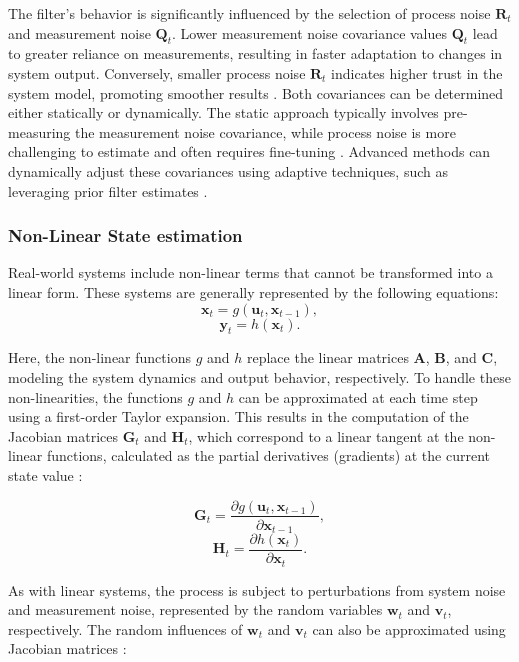 The filter's behavior is significantly influenced by the selection of process noise \( \mathbf{R}_t \) and measurement noise \( \mathbf{Q}_t \). Lower measurement noise covariance values \( \mathbf{Q}_t \) lead to greater reliance on measurements, resulting in faster adaptation to changes in system output. Conversely, smaller process noise \( \mathbf{R}_t \) indicates higher trust in the system model, promoting smoother results \citep{balzer2018kalman}. Both covariances can be determined either statically or dynamically. The static approach typically involves pre-measuring the measurement noise covariance, while process noise is more challenging to estimate and often requires fine-tuning \citep{welch2006kalman}. Advanced methods can dynamically adjust these covariances using adaptive techniques, such as leveraging prior filter estimates \citep{welch2006kalman}.


\subsubsection{Non-Linear State estimation}

Real-world systems include non-linear terms that cannot be transformed into a linear form. These systems are generally represented by the following equations:
\[
\mathbf{x}_t = g(\mathbf{u}_t, \mathbf{x}_{t-1}), \tag{2.9}
\]
\[
\mathbf{y}_t = h(\mathbf{x}_t). \tag{2.10}
\]

Here, the non-linear functions \( g \) and \( h \) replace the linear matrices \( \mathbf{A} \), \( \mathbf{B} \), and \( \mathbf{C} \), modeling the system dynamics and output behavior, respectively. To handle these non-linearities, the functions \( g \) and \( h \) can be approximated at each time step using a first-order Taylor expansion. This results in the computation of the Jacobian matrices \( \mathbf{G}_t \) and \( \mathbf{H}_t \), which correspond to a linear tangent at the non-linear functions, calculated as the partial derivatives (gradients) at the current state value \citep{thrun2000probabilistic}:

\[
\mathbf{G}_t = \frac{\partial g(\mathbf{u}_t, \mathbf{x}_{t-1})}{\partial \mathbf{x}_{t-1}}, \tag{2.11}
\]
\[
\mathbf{H}_t = \frac{\partial h(\mathbf{x}_t)}{\partial \mathbf{x}_t}. \tag{2.12}
\]

As with linear systems, the process is subject to perturbations from system noise and measurement noise, represented by the random variables \( \mathbf{w}_t \) and \( \mathbf{v}_t \), respectively. The random influences of \( \mathbf{w}_t \) and \( \mathbf{v}_t \) can also be approximated using Jacobian matrices \citep{welch2006kalman}:

